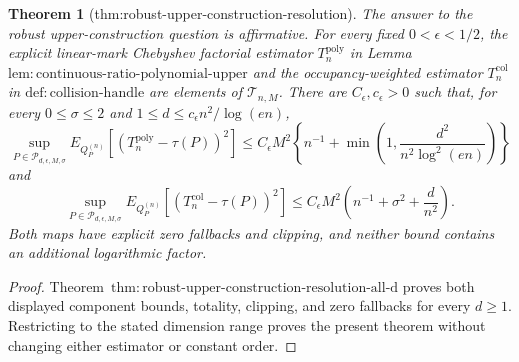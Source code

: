 \documentclass{article}
\newtheorem{theorem}{Theorem}
\begin{document}
\begin{theorem}[thm:robust-upper-construction-resolution]\label{thm:robust-upper-construction-resolution}
The answer to the robust upper-construction question is affirmative.  For every fixed \(0<\epsilon<1/2\), the explicit linear-mark Chebyshev factorial estimator \(T_n^{\mathrm{poly}}\) in Lemma~\(\mathrm{lem:continuous\text{-}ratio\text{-}polynomial\text{-}upper}\) and the occupancy-weighted estimator \(T_n^{\mathrm{col}}\) in \(\mathrm{def:collision\text{-}handle}\) are elements of \(\mathcal T_{n,M}\).  There are \(C_{\epsilon},c_{\epsilon}>0\) such that, for every \(0\le\sigma\le2\) and \(1\le d\le c_{\epsilon}n^2/\log(en)\),
\[
 \sup_{P\in\mathcal P_{d,\epsilon,M,\sigma}}
 E_{Q_P^{(n)}}[(T_n^{\mathrm{poly}}-\tau(P))^2]
 \le C_{\epsilon}M^2\left\{n^{-1}+\min\left(1,\frac{d^2}{n^2\log^2(en)}\right)\right\}
\]
and
\[
 \sup_{P\in\mathcal P_{d,\epsilon,M,\sigma}}
 E_{Q_P^{(n)}}[(T_n^{\mathrm{col}}-\tau(P))^2]
 \le C_{\epsilon}M^2\left(n^{-1}+\sigma^2+\frac d{n^2}\right).
\]
Both maps have explicit zero fallbacks and clipping, and neither bound contains an additional logarithmic factor.
\end{theorem}
\begin{proof}
Theorem~\(\mathrm{thm:robust\text{-}upper\text{-}construction\text{-}resolution\text{-}all\text{-}d}\) proves both displayed component bounds, totality, clipping, and zero fallbacks for every \(d\ge1\).  Restricting to the stated dimension range proves the present theorem without changing either estimator or constant order.
\end{proof}
\end{document}
